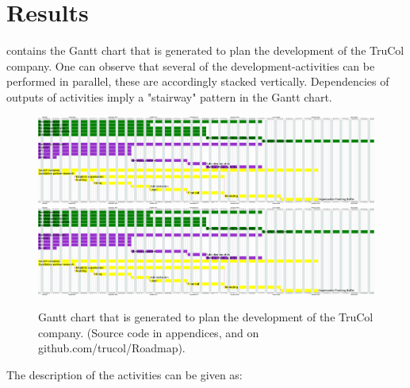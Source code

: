 \section{Results}\label{sec:results}
%
 contains the Gantt chart that is generated to plan the development of the TruCol company. One can observe that several of the development-activities can be performed in parallel, these are accordingly stacked vertically. Dependencies of outputs of activities imply a "stairway" pattern in the Gantt chart.
\clearpage
\begin{figure}
\hspace*{-0cm}
	\ifx\homepath\overleafhome
		\includegraphics[width=775pt]{Images/created.png}
	\else
		\includegraphics[width=775pt]{latex/Images/created.png}
	\fi
    \caption{Gantt chart that is generated to plan the development of the TruCol company. (Source code in appendices, and on github.com/trucol/Roadmap).}
    \label{fig:gantt}
\end{figure}
\clearpage
The description of the activities can be given as:
